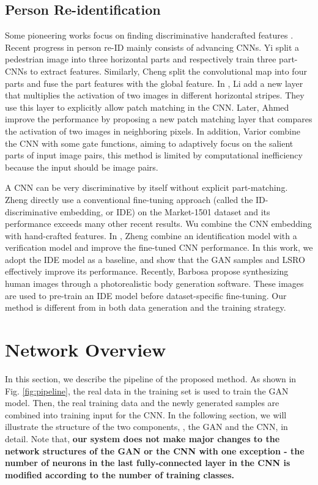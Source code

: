 \documentclass[10pt,twocolumn,letterpaper]{article}
\begin{document}
\subsection{Person Re-identification}
Some pioneering works focus on finding discriminative handcrafted features \cite{ma2012bicov,ma2014covariance,liao2015person}. Recent progress in person re-ID mainly consists of advancing CNNs. Yi \etal \cite{yi2014deep} split a pedestrian image into three horizontal parts and respectively train three part-CNNs to extract features. Similarly, Cheng \etal \cite{cheng2016person} split the convolutional map into four parts and fuse the part features with the global feature. In \cite{li2014deepreid}, Li \etal add a new layer that multiplies the activation of two images in different horizontal stripes. They use this layer to explicitly allow patch matching in the CNN. Later, Ahmed \etal \cite{ahmed2015improved} improve the performance by proposing a new patch matching layer that compares the activation of two images in neighboring pixels. In addition, Varior \etal \cite{varior2016gated} combine the CNN with some gate functions, aiming to adaptively focus on the salient parts of input image pairs, this method is limited by computational inefficiency because the input should be image pairs. 

A CNN can be very discriminative by itself without explicit part-matching. Zheng \etal \cite{zheng2016survey,zheng2016person} directly use a conventional fine-tuning approach (called the ID-discriminative embedding, or IDE) on the Market-1501 dataset \cite{zheng2015scalable} and its performance exceeds many other recent results. Wu \etal \cite{wu2016enhanced} combine the CNN embedding with hand-crafted features. In \cite{zheng2016discriminatively}, Zheng \etal combine an identification model with a verification model and improve the fine-tuned CNN performance. In this work, we adopt the IDE model \cite{zheng2016survey,zheng2016person} as a baseline, and show that the GAN samples and LSRO effectively improve its performance. Recently, Barbosa \etal \cite{barbosa2017looking} propose synthesizing human images through a photorealistic body generation software. These images are used to pre-train an IDE model before dataset-specific fine-tuning. Our method is different from \cite{barbosa2017looking} in both data generation and the training strategy.


\section{Network Overview}
In this section, we describe the pipeline of the proposed method. As shown in Fig. \ref{fig:pipeline}, the real data in the training set is used to train the GAN model. Then, the real training data and the newly generated samples are combined into training input for the CNN. In the following section, we will illustrate the structure of the two components, \ie, the GAN and the CNN, in detail. Note that, \textbf{our system does not make major changes to the network structures of the GAN or the CNN with one exception - the number of neurons in the last fully-connected layer in the CNN is modified according to the number of training classes.}
\end{document}
